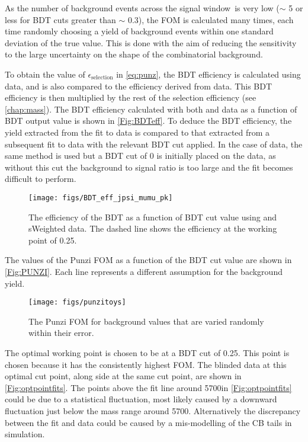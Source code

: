 As the number of background events across the signal window\
is very low ($\sim$ 5 or less for BDT cuts greater than $\sim$ 0.3), the FOM is calculated many times, each time randomly choosing a yield of background events within one standard deviation of the true value. This is done with the aim of reducing the sensitivity to the large uncertainty on the shape of the combinatorial background.

To obtain the value of $\epsilon_{\mathrm{selection}}$ in \autoref{eq:punz}, the BDT efficiency is calculated using \LbKjpsi data, and is also compared to the efficiency derived from \LbK data. This BDT efficiency is then multiplied by the rest of the selection efficiency (see \autoref{chap:mass}).
The BDT efficiency calculated with both \LbK and \LbKjpsi data as a function of BDT output value is shown in \autoref{Fig:BDTeff}. To deduce the BDT efficiency, the yield extracted from the fit to \LbKjpsi data is compared to that extracted from a subsequent fit to \LbKjpsi data with the relevant BDT cut applied. In the case of \LbK data, the same method is used but a BDT cut of 0 is initially placed on the \LbK data, as without this cut the background to signal ratio is too large and the fit becomes difficult to perform.
\begin{figure}[!ht]
  \centering
  \texttt{[image: figs/BDT\_eff\_jpsi\_mumu\_pk]}
  \caption{The efficiency of the BDT as a function of BDT cut value using \LbK and \LbKjpsi sWeighted data. The dashed line shows the efficiency at the working point of 0.25.}
  \label{Fig:BDTeff}
\end{figure}

The values of the Punzi FOM as a function of the BDT cut value are shown in \autoref{Fig:PUNZI}. Each line represents a different assumption for the background yield.
\begin{figure}[!ht]
  \centering
  \texttt{[image: figs/punzitoys]}
  \caption{The Punzi FOM for background values that are varied randomly within their error.}
  \label{Fig:PUNZI}
\end{figure}
The  optimal working point is chosen to be at a BDT cut of 0.25. This point is chosen because it has the consistently highest FOM. The blinded \Lbpi data at this optimal cut point, along side \Lbpijpsi at the same cut point, are shown in \autoref{Fig:optpointfits}. The points above the fit line around 5700\mevcc in \autoref{Fig:optpointfits}\protect{} could be due to a statistical fluctuation, most likely caused by a downward fluctuation just below the mass range around 5700\mevc. Alternatively the discrepancy between the fit and data could be caused by a mis-modelling of the CB tails in simulation.

